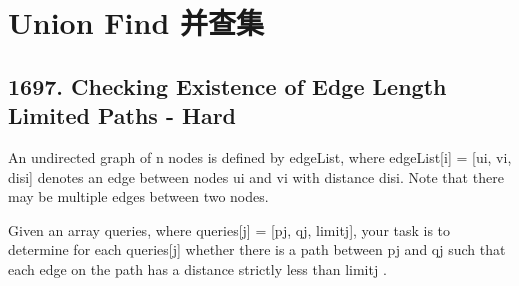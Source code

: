 \documentclass[9pt, b5paaper]{book}
\begin{document}
\chapter{Union Find 并查集}
\label{sec-17}
\section{1697. Checking Existence of Edge Length Limited Paths - Hard}
\label{sec-17-1}
An undirected graph of n nodes is defined by edgeList, where edgeList[i] = [ui, vi, disi] denotes an edge between nodes ui and vi with distance disi. Note that there may be multiple edges between two nodes.

Given an array queries, where queries[j] = [pj, qj, limitj], your task is to determine for each queries[j] whether there is a path between pj and qj such that each edge on the path has a distance strictly less than limitj .
\end{document}
